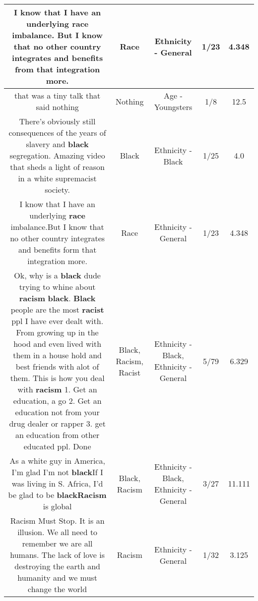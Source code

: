 \documentclass[11pt]{article}
\newlength\mylength
\begin{document}
\begin{center}
\begin{longtable}{|C{.65\mylength}|C{.30\mylength}|C{.12\mylength}|C{.12\mylength}|C{.12\mylength}|}
  \small I know that I have an underlying \textbf{race} imbalance. But I know that no other country integrates and benefits from that integration more.\normalsize   & Race & Ethnicity - General & 1/23 & 4.348 \\  \hline
  \small that was a tiny talk that said nothing\normalsize   & Nothing & Age - Youngsters & 1/8 & 12.5 \\  \hline
  \small There's obviously still consequences of the years of slavery and \textbf{black} segregation. Amazing video that sheds a light of reason in a white supremacist society.\normalsize   & Black & Ethnicity - Black & 1/25 & 4.0 \\  \hline
  \small I know that I have an underlying \textbf{race} imbalance.But I know that no other country integrates and benefits form that integration more.\normalsize   & Race & Ethnicity - General & 1/23 & 4.348 \\  \hline
  \small Ok, why is a \textbf{black} dude trying to whine about \textbf{racism} \textbf{black}. \textbf{Black} people are the most \textbf{racist} ppl I have ever dealt with. From growing up in the hood and even lived with them in a house hold and best friends with alot of them. This is how you deal with \textbf{racism} 1. Get an education, a go 2. Get an education not from your drug dealer or rapper 3. get an education from other educated ppl. Done\normalsize   & Black, Racism, Racist & Ethnicity - Black, Ethnicity - General & 5/79 & 6.329 \\  \hline
  \small As a white guy in America, I'm glad I'm not \textbf{black}If I was living in S. Africa, I'd be glad to be \textbf{black}\textbf{Racism} is global\normalsize   & Black, Racism & Ethnicity - Black, Ethnicity - General & 3/27 & 11.111 \\  \hline
  \small Racism Must Stop. It is an illusion. We all need to remember we are all humans. The lack of love is destroying the earth and humanity and we must change the world\normalsize   & Racism & Ethnicity - General & 1/32 & 3.125 \\  \hline

\end{longtable}
\end{center}
\end{document}
